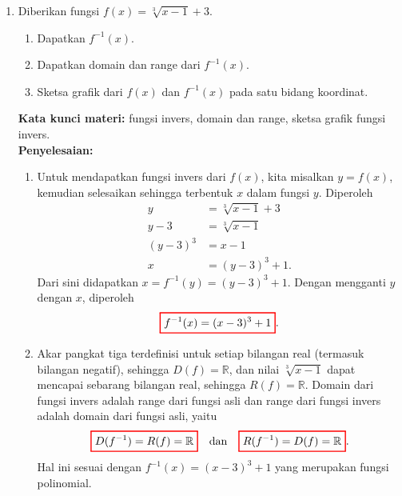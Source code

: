 \documentclass[10pt,openany,a4paper]{article}
\theoremstyle{definition}
\theoremstyle{definition}
\theoremstyle{plain}
\newenvironment{jawab}[2][tes]{%
\par\noindent\textbf{Kata kunci materi:} #1.\\
\textbf{Penyelesaian:} #2%
}{}
\begin{document}
\begin{enumerate}
    \item Diberikan fungsi $f(x)=\sqrt[3]{x-1}+3$.
    \begin{enumerate}
        \item Dapatkan $f^{-1}(x)$.
        \item Dapatkan domain dan range dari $f^{-1}(x)$.
        \item Sketsa grafik dari $f(x)$ dan $f^{-1}(x)$ pada satu bidang koordinat.
    \end{enumerate}
    \begin{jawab}[fungsi invers, domain dan range, sketsa grafik fungsi invers]{
        \begin{enumerate}
            \item Untuk mendapatkan fungsi invers dari $f(x)$, kita misalkan $y=f(x)$, kemudian selesaikan sehingga terbentuk $x$ dalam fungsi $y$. Diperoleh
            \begin{align*}
                y &= \sqrt[3]{x-1}+3\\
                y-3 &= \sqrt[3]{x-1}\\
                (y-3)^3 &= x-1\\
                x &= (y-3)^3+1.
            \end{align*}
            Dari sini didapatkan $x = f^{-1}(y) = (y-3)^3+1$. Dengan mengganti $y$ dengan $x$, diperoleh
            \begin{align*}
                \colorlet{oldcolor}{.}
        \color{red}
        \setlength{\fboxrule}{1pt} \boxed{\color{oldcolor}f^{-1}(x) = (x-3)^3+1}\color{oldcolor}.
            \end{align*}
            \item Akar pangkat tiga terdefinisi untuk setiap bilangan real (termasuk bilangan negatif), sehingga $D(f)=\mathbb{R}$, dan nilai $\sqrt[3]{x-1}$ dapat mencapai sebarang bilangan real, sehingga $R(f)=\mathbb{R}$. Domain dari fungsi invers adalah range dari fungsi asli dan range dari fungsi invers adalah domain dari fungsi asli, yaitu
            \begin{align*}
                \colorlet{oldcolor}{.}
        \color{red}
        \setlength{\fboxrule}{1pt} \boxed{\color{oldcolor}D(f^{-1}) = R(f) = \mathbb{R}}\color{oldcolor} \quad\text{dan}\quad \colorlet{oldcolor}{.}
        \color{red}
        \setlength{\fboxrule}{1pt} \boxed{\color{oldcolor}R(f^{-1}) = D(f) = \mathbb{R}}\color{oldcolor}.
            \end{align*}
            Hal ini sesuai dengan $f^{-1}(x)=(x-3)^3+1$ yang merupakan fungsi polinomial.

\end{enumerate}}
\end{jawab}
\end{enumerate}
\end{document}
